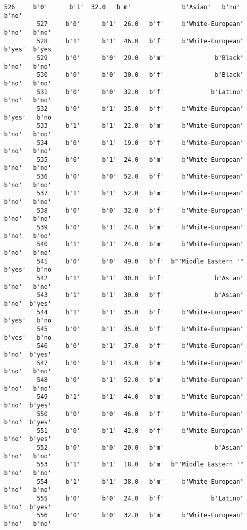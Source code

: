 \documentclass[11pt]{article}
\begin{document}
\begin{Verbatim}[commandchars=\\\{\}]
         526     b'0'      b'1'  32.0   b'm'              b'Asian'   b'no'   b'no'   
         527     b'0'      b'1'  26.0   b'f'     b'White-European'   b'no'   b'no'   
         528     b'1'      b'1'  46.0   b'f'     b'White-European'  b'yes'  b'yes'   
         529     b'0'      b'0'  29.0   b'm'              b'Black'   b'no'   b'no'   
         530     b'0'      b'0'  30.0   b'f'              b'Black'   b'no'   b'no'   
         531     b'0'      b'0'  32.0   b'f'             b'Latino'   b'no'   b'no'   
         532     b'0'      b'1'  35.0   b'f'     b'White-European'  b'yes'   b'no'   
         533     b'1'      b'1'  22.0   b'm'     b'White-European'   b'no'   b'no'   
         534     b'0'      b'1'  19.0   b'f'     b'White-European'   b'no'   b'no'   
         535     b'0'      b'1'  24.0   b'm'     b'White-European'   b'no'   b'no'   
         536     b'0'      b'0'  52.0   b'f'     b'White-European'   b'no'   b'no'   
         537     b'1'      b'1'  52.0   b'm'     b'White-European'   b'no'   b'no'   
         538     b'0'      b'0'  32.0   b'f'     b'White-European'   b'no'   b'no'   
         539     b'0'      b'1'  24.0   b'm'     b'White-European'   b'no'   b'no'   
         540     b'1'      b'1'  24.0   b'm'     b'White-European'   b'no'   b'no'   
         541     b'0'      b'0'  49.0   b'f'  b"'Middle Eastern '"  b'yes'   b'no'   
         542     b'1'      b'1'  30.0   b'f'              b'Asian'   b'no'   b'no'   
         543     b'1'      b'1'  30.0   b'f'              b'Asian'   b'no'  b'yes'   
         544     b'1'      b'1'  35.0   b'f'     b'White-European'  b'yes'   b'no'   
         545     b'0'      b'1'  35.0   b'f'     b'White-European'  b'yes'   b'no'   
         546     b'0'      b'1'  37.0   b'f'     b'White-European'   b'no'  b'yes'   
         547     b'0'      b'1'  43.0   b'm'     b'White-European'   b'no'   b'no'   
         548     b'0'      b'1'  52.0   b'm'     b'White-European'   b'no'   b'no'   
         549     b'1'      b'1'  44.0   b'm'     b'White-European'   b'no'  b'yes'   
         550     b'0'      b'0'  46.0   b'f'     b'White-European'   b'no'  b'yes'   
         551     b'0'      b'1'  42.0   b'f'     b'White-European'   b'no'  b'yes'   
         552     b'0'      b'0'  20.0   b'm'              b'Asian'   b'no'   b'no'   
         553     b'1'      b'1'  18.0   b'm'  b"'Middle Eastern '"   b'no'   b'no'   
         554     b'1'      b'1'  38.0   b'm'     b'White-European'   b'no'   b'no'   
         555     b'0'      b'0'  24.0   b'f'             b'Latino'   b'no'  b'yes'   
         556     b'0'      b'0'  32.0   b'm'     b'White-European'   b'no'   b'no'   

\end{Verbatim}
\end{document}
